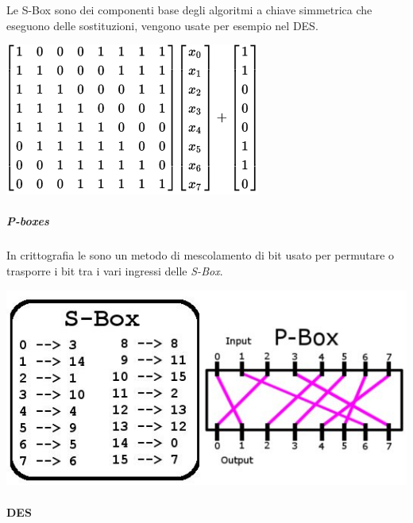 Le S-Box sono dei componenti base degli algoritmi a chiave simmetrica che 
eseguono delle sostituzioni, vengono usate per esempio nel DES.

\begin{center}
  \includegraphics[scale=0.5]{res/img/sboxes.png}
  \label{fig:password:sboxes}
\end{center}



\subparagraph*{P-boxes}
In crittografia le  sono un
metodo di mescolamento di bit usato per permutare o trasporre i bit
tra i vari ingressi delle \textit{S-Box}.

\begin{center}
  \includegraphics[scale=0.3]{res/img/pboxes.png}
  \label{fig:password:pboxes}
\end{center}


\paragraph{DES}

